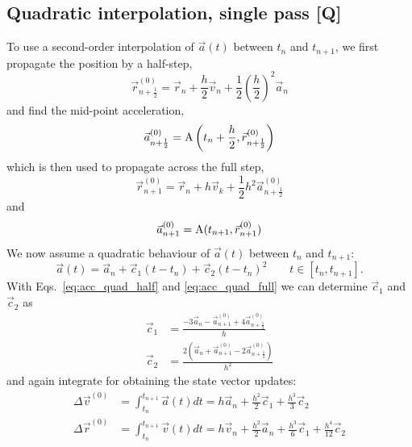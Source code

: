 \documentclass[a4paper]{article}
\begin{document}
\subsection{Quadratic interpolation, single pass [Q]}
To use a second-order interpolation of $\vec{a}(t)$ between $t_n$ and $t_{n+1}$, we first propagate the position by a half-step,
\begin{equation*}
\vec{r}_{n+\frac{1}{2}}^{(0)} = \vec{r}_n + \frac{h}{2} \vec{v}_n + \frac{1}{2}\left(\frac{h}{2}\right)^2\vec{a}_n
\end{equation*}
and find the mid-point acceleration,
\begin{equation}
\vec{a}_{n+\frac{1}{2}}^{(0)} = \mathrm{A}\left(t_n+\frac{h}{2},\vec{r}_{n+\frac{1}{2}}^{(0)}\right)\label{eq:acc_quad_half}
\end{equation}
which is then used to propagate across the full step,
\begin{equation*}
\vec{r}_{n+1}^{(0)} = \vec{r}_n + h\vec{v}_k + \frac{1}{2}h^2\vec{a}_{n+\frac{1}{2}}^{(0)}
\end{equation*}
and
\begin{equation}
\vec{a}_{n+1}^{(0)} = \mathrm{A}(t_{n+1},\vec{r}_{n+1}^{(0)})\label{eq:acc_quad_full}
\end{equation}
We now assume a quadratic behaviour of $\vec{a}(t)$ between $t_n$ and $t_{n+1}$:
\begin{equation*}
\vec{a}(t) = \vec{a}_n + \vec{c}_1 (t-t_n) + \vec{c}_2 (t-t_n)^2
\qquad t \in [t_n, t_{n+1}].
\end{equation*}
With Eqs.~\ref{eq:acc_quad_half} and \ref{eq:acc_quad_full} we can determine
$\vec{c}_1$ and $\vec{c}_2$ as
\begin{equation*}
\begin{split}
\vec{c}_1 &= \frac{-3\vec{a}_n - \vec{a}_{n+1}^{(0)} + 4\vec{a}_{n+\frac{1}{2}}^{(0)}}{h} \\
\vec{c}_2 &= \frac{2(\vec{a}_n + \vec{a}_{n+1}^{(0)} - 2 \vec{a}_{n+\frac{1}{2}}^{(0)})}{h^2}
\end{split}
\end{equation*}
and again integrate for obtaining the state vector updates:
\begin{equation*}
\begin{split}
\Delta\vec{v}^{(0)} &= \int_{t_n}^{t_{n+1}} \vec{a}(t) dt = h\vec{a}_n + \frac{h^2}{2} \vec{c}_1 + \frac{h^3}{3} \vec{c}_2 \\
\Delta\vec{r}^{(0)} &= \int_{t_n}^{t_{n+1}} \vec{v}(t) dt = h\vec{v}_n + \frac{h^2}{2}\vec{a}_n + \frac{h^3}{6}\vec{c}_1 + \frac{h^4}{12}\vec{c}_2
\end{split}
\end{equation*}
\end{document}
